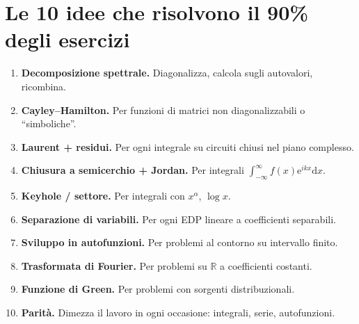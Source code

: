 \documentclass[11pt,a4paper,openany]{book}
\theoremstyle{definition}
\newcommand{\R}{\mathbb{R}}
\newcommand{\dd}{\mathrm{d}}
\newcommand{\eu}{\mathrm{e}}
\begin{document}
\section{Le 10 idee che risolvono il 90\% degli esercizi}
\begin{enumerate}
\item \textbf{Decomposizione spettrale.} Diagonalizza, calcola sugli autovalori, ricombina.
\item \textbf{Cayley--Hamilton.} Per funzioni di matrici non diagonalizzabili o ``simboliche''.
\item \textbf{Laurent + residui.} Per ogni integrale su circuiti chiusi nel piano complesso.
\item \textbf{Chiusura a semicerchio + Jordan.} Per integrali $\int_{-\infty}^\infty f(x)\eu^{ikx}\dd x$.
\item \textbf{Keyhole / settore.} Per integrali con $x^\alpha$, $\log x$.
\item \textbf{Separazione di variabili.} Per ogni EDP lineare a coefficienti separabili.
\item \textbf{Sviluppo in autofunzioni.} Per problemi al contorno su intervallo finito.
\item \textbf{Trasformata di Fourier.} Per problemi su $\R$ a coefficienti costanti.
\item \textbf{Funzione di Green.} Per problemi con sorgenti distribuzionali.
\item \textbf{Parit\`a.} Dimezza il lavoro in ogni occasione: integrali, serie, autofunzioni.
\end{enumerate}
\end{document}

